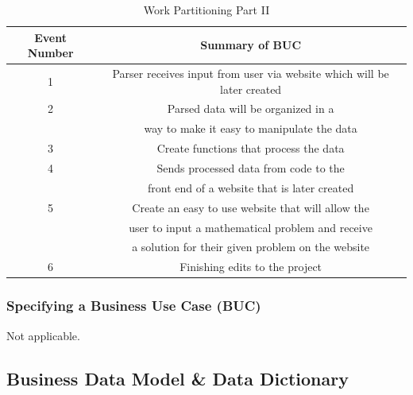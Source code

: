 \documentclass[11pt, oneside]{article}
\begin{document}
\begin{table}[H]
\caption{Work Partitioning Part II}
\begin{center}
\begin{tabular}{|c|c|}

\hline
Event Number & Summary of BUC\\
\hline
1 & Parser receives input from user via website which will be later created \\
\hline
2 & Parsed data will be organized in a\\ &way to make it easy to manipulate the data\\
\hline
3 & Create functions that process the data \\
\hline
4 & Sends processed data from code to the\\ &front end of a website that is later created\\
\hline
5 & Create an easy to use website that will allow the\\ &user to input a mathematical problem and receive\\ &a solution for their given problem on the website\\
\hline
6 & Finishing edits to the project\\
\hline

\end{tabular}
\end{center}
\label{default}
\end{table}%



\subsubsection{Specifying a Business Use Case (BUC)}
Not applicable.


\subsection{Business Data Model \& Data Dictionary}
\end{document}
